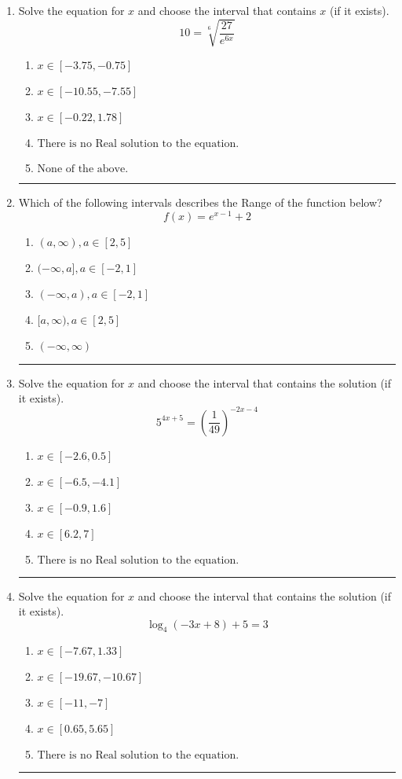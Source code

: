 \documentclass[14pt]{extbook}
\newcommand{\litem}[1]{\item#1\hspace*{-1cm}\rule{\textwidth}{0.4pt}}
\begin{document}
\begin{enumerate}
{\begin{enumerate}[label=\Alph*.]
\end{enumerate} }
\litem{
 Solve the equation for $x$ and choose the interval that contains $x$ (if it exists).\[  10 = \sqrt[6]{\frac{27}{e^{6x}}} \]\begin{enumerate}[label=\Alph*.]
\item \( x \in [-3.75, -0.75] \)
\item \( x \in [-10.55, -7.55] \)
\item \( x \in [-0.22, 1.78] \)
\item \( \text{There is no Real solution to the equation.} \)
\item \( \text{None of the above.} \)

\end{enumerate} }
\litem{
Which of the following intervals describes the Range of the function below?\[ f(x) = e^{x-1}+2 \]\begin{enumerate}[label=\Alph*.]
\item \( (a, \infty), a \in [2, 5] \)
\item \( (-\infty, a], a \in [-2, 1] \)
\item \( (-\infty, a), a \in [-2, 1] \)
\item \( [a, \infty), a \in [2, 5] \)
\item \( (-\infty, \infty) \)

\end{enumerate} }
\litem{
Solve the equation for $x$ and choose the interval that contains the solution (if it exists).\[ 5^{4x+5} = \left(\frac{1}{49}\right)^{-2x-4} \]\begin{enumerate}[label=\Alph*.]
\item \( x \in [-2.6, 0.5] \)
\item \( x \in [-6.5, -4.1] \)
\item \( x \in [-0.9, 1.6] \)
\item \( x \in [6.2, 7] \)
\item \( \text{There is no Real solution to the equation.} \)

\end{enumerate} }
\litem{
Solve the equation for $x$ and choose the interval that contains the solution (if it exists).\[ \log_{4}{(-3x+8)}+5 = 3 \]\begin{enumerate}[label=\Alph*.]
\item \( x \in [-7.67, 1.33] \)
\item \( x \in [-19.67, -10.67] \)
\item \( x \in [-11, -7] \)
\item \( x \in [0.65, 5.65] \)
\item \( \text{There is no Real solution to the equation.} \)


\end{enumerate}}
\end{enumerate}
\end{document}
